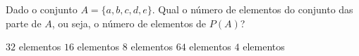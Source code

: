 \noindent\parbox{\linewidth}{

Dado o conjunto $A=\{a,b,c,d,e\}$. Qual o número de elementos do conjunto das parte de $A$, ou seja, o número de elementos de $P(A)$?

$32$ elementos
$16$ elementos
$8$ elementos
$64$ elementos
$4$ elementos


}





